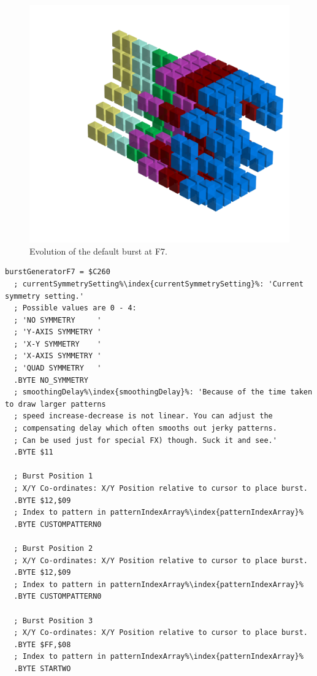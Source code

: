 \clearpage
{}
\begin{figure}[H]
    \hspace{-1.5cm}
    \begin{adjustbox}{width=17cm,center}
      \includegraphics[width=17cm]{src/patterns/bursts/pattern3-45.png}%
    \end{adjustbox}
\caption{Evolution of the default burst at F7.}
\end{figure}
\clearpage

\begin{lstlisting}[caption=Source code for the F7 Burst.,escapechar=\%]
burstGeneratorF7 = $C260
  ; currentSymmetrySetting%\index{currentSymmetrySetting}%: 'Current symmetry setting.'
  ; Possible values are 0 - 4:
  ; 'NO SYMMETRY     '
  ; 'Y-AXIS SYMMETRY '
  ; 'X-Y SYMMETRY    '
  ; 'X-AXIS SYMMETRY '
  ; 'QUAD SYMMETRY   '
  .BYTE NO_SYMMETRY
  ; smoothingDelay%\index{smoothingDelay}%: 'Because of the time taken to draw larger patterns
  ; speed increase-decrease is not linear. You can adjust the 
  ; compensating delay which often smooths out jerky patterns. 
  ; Can be used just for special FX) though. Suck it and see.'
  .BYTE $11

  ; Burst Position 1
  ; X/Y Co-ordinates: X/Y Position relative to cursor to place burst.
  .BYTE $12,$09
  ; Index to pattern in patternIndexArray%\index{patternIndexArray}%
  .BYTE CUSTOMPATTERN0

  ; Burst Position 2
  ; X/Y Co-ordinates: X/Y Position relative to cursor to place burst.
  .BYTE $12,$09
  ; Index to pattern in patternIndexArray%\index{patternIndexArray}%
  .BYTE CUSTOMPATTERN0

  ; Burst Position 3
  ; X/Y Co-ordinates: X/Y Position relative to cursor to place burst.
  .BYTE $FF,$08
  ; Index to pattern in patternIndexArray%\index{patternIndexArray}%
  .BYTE STARTWO

\end{lstlisting}

\clearpage
